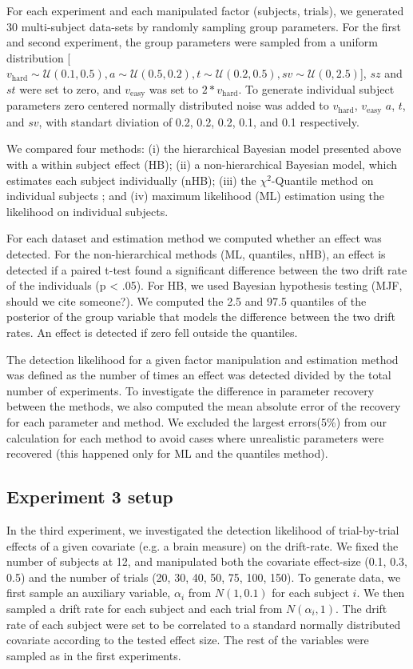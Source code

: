 \documentclass[letterpaper,10pt,english]{article}
\begin{document}
For each experiment and each manipulated factor (subjects, trials), we generated 30 multi-subject data-sets by randomly sampling group parameters. For the first and second experiment, the group parameters were sampled from a uniform distribution [$v_{\text{hard}} \sim \mathcal{U}(0.1, 0.5), a \sim \mathcal{U}(0.5, 0.2), t \sim \mathcal{U}(0.2, 0.5), sv \sim \mathcal{U}(0, 2.5)$], $sz$ and $st$ were set to zero, and $v_{\text{easy}}$ was set to $2*v_{\text{hard}}$. To generate individual subject parameters zero centered normally distributed noise was added to $v_{\text{hard}}$, $v_{\text{easy}}$ $a$, $t$, and $sv$, with standart diviation of 0.2, 0.2,  0.2, 0.1, and 0.1 respectively.

We compared four methods: (i) the hierarchical Bayesian model presented above with a within subject effect (HB); (ii) a non-hierarchical Bayesian model, which estimates each subject individually (nHB); (iii) the $\chi^2$-Quantile method on individual subjects \citep{RatcliffTuerlinckx02}; and (iv) maximum likelihood (ML) estimation using the \citet{NavarroFuss09} likelihood on individual subjects.

For each dataset and estimation method we computed whether an effect was detected. For the non-hierarchical methods (ML, quantiles, nHB), an effect is detected if a paired t-test found a significant difference between the two drift rate of the individuals (p < .05). For HB, we used Bayesian hypothesis testing  (MJF, should we cite someone?). We computed the 2.5 and 97.5  quantiles of the posterior of the group variable that models the difference between the two drift rates. An effect is detected if zero fell outside the quantiles.

The detection likelihood for a given factor manipulation and estimation method was defined as the number of times an effect was detected divided by the total number of experiments. To investigate the difference in parameter recovery between the methods, we also computed the mean absolute error of the recovery for each parameter and method. We excluded the largest errors(5\%) from our calculation for each method to avoid cases where unrealistic parameters were recovered (this happened only for ML and the quantiles method).

\subsection*{Experiment 3 setup}
In the third experiment, we investigated the detection likelihood of trial-by-trial effects of a given covariate (e.g. a brain measure) on the drift-rate. We fixed the number of subjects at 12, and manipulated both the covariate effect-size (0.1, 0.3, 0.5) and the number of trials (20, 30, 40, 50, 75, 100, 150). To generate data, we first sample an auxiliary variable, $\alpha_i$ from $N(1, 0.1)$ for each subject $i$. We then sampled a drift rate for each subject and each trial from $N(\alpha_i, 1)$. The drift rate of each subject were set to be correlated to a standard normally distributed covariate according to the tested effect size. The rest of the variables were sampled as in the first experiments.
\end{document}
